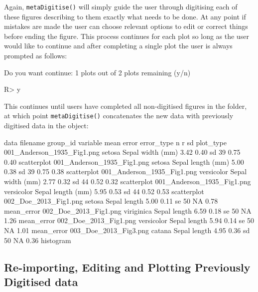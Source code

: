 \documentclass[12pt]{article}
\newcommand{\fct}[1]{\texttt{#1()}}
\begin{document}
Again, \fct{metaDigitise} will simply guide the user through digitising each of these figures describing to them exactly what needs to be done. At any point if mistakes are made the user can choose relevant options to edit or correct things before ending the figure. This process continues for each plot so long as the user would like to continue and after completing a single plot the user is always prompted as follows:

\begin{CodeChunk}
\begin{CodeOutput}
Do you want continue: 1 plots out of 2 plots remaining (y/n)
\end{CodeOutput}
\begin{CodeInput}
R> y
\end{CodeInput}
\end{CodeChunk}

This continues until users have completed all non-digitised figures in the folder, at which point \fct{metaDigitise} concatenates the new data with previously digitised data in the object:

\begin{CodeChunk}
{\scriptsize
\begin{CodeOutput}
data
                  filename    group_id         variable   mean  error error_type n    r    sd   plot_type
001_Anderson_1935_Fig1.png      setosa  Sepal width (mm)  3.42  0.40  sd        39  0.75  0.40  scatterplot
001_Anderson_1935_Fig1.png      setosa  Sepal length (mm) 5.00  0.38  sd        39  0.75  0.38  scatterplot
001_Anderson_1935_Fig1.png  versicolor  Sepal width (mm)  2.77  0.32  sd        44  0.52  0.32  scatterplot
001_Anderson_1935_Fig1.png  versicolor  Sepal length (mm) 5.95  0.53  sd        44  0.52  0.53  scatterplot
     002_Doe_2013_Fig1.png      setosa  Sepal length      5.00  0.11  se        50  NA    0.78  mean_error
     002_Doe_2013_Fig1.png  viriginica  Sepal length      6.59  0.18  se        50  NA    1.26  mean_error
     002_Doe_2013_Fig1.png  versicolor  Sepal length      5.94  0.14  se        50  NA    1.01  mean_error
     003_Doe_2013_Fig3.png      catana  Sepal length      4.95  0.36  sd        50  NA    0.36  histogram
\end{CodeOutput}
}
\end{CodeChunk}


\subsection{Re-importing, Editing and Plotting Previously Digitised data}
\end{document}
